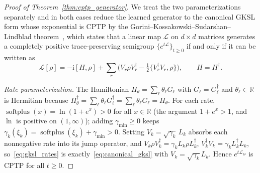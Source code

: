 \documentclass[11pt]{article}
\DeclareMathOperator{\softplus}{softplus}
\newcommand{\R}{\mathbb{R}}
\newcommand{\calL}{\mathcal{L}}
\newcommand{\ii}{\mathrm{i}}
\begin{document}
\begin{proof}[Proof of Theorem~\ref{thm:cptp_generator}]
We treat the two parameterizations separately and in both cases reduce the learned generator to the canonical GKSL form whose exponential is CPTP by the Gorini--Kossakowski--Sudarshan--Lindblad theorem~\cite{lindblad1976generators,gorini1976completely,breuer2002theory}, which states that a linear map $\calL$ on $d\times d$ matrices generates a completely positive trace-preserving semigroup $\{e^{t\calL}\}_{t\ge0}$ if and only if it can be written as
\begin{equation}
\calL[\rho]=-\ii[H,\rho]+\sum_{r}\Big(V_r\rho V_r^\dagger-\tfrac12\{V_r^\dagger V_r,\rho\}\Big),\qquad H=H^\dagger.
\label{eq:canonical_gksl}
\end{equation}

\emph{Rate parameterization.} The Hamiltonian $H_\theta=\sum_\ell\theta_\ell G_\ell$ with $G_\ell=G_\ell^\dagger$ and $\theta_\ell\in\R$ is Hermitian because $H_\theta^\dagger=\sum_\ell\theta_\ell G_\ell^\dagger=\sum_\ell\theta_\ell G_\ell=H_\theta$. For each rate, $\softplus(x)=\ln(1+e^x)>0$ for all $x\in\R$ (the argument $1+e^x>1$, and $\ln$ is positive on $(1,\infty)$); adding $\gamma_{\min}\ge0$ keeps $\gamma_k(\xi_k)=\softplus(\xi_k)+\gamma_{\min}>0$. Setting $V_k=\sqrt{\gamma_k}\,L_k$ absorbs each nonnegative rate into its jump operator, and $V_k\rho V_k^\dagger=\gamma_k L_k\rho L_k^\dagger$, $V_k^\dagger V_k=\gamma_k L_k^\dagger L_k$, so~\eqref{eq:gksl_rates} is exactly~\eqref{eq:canonical_gksl} with $V_k=\sqrt{\gamma_k}L_k$. Hence $e^{t\calL_\Theta}$ is CPTP for all $t\ge0$.


\end{proof}
\end{document}
